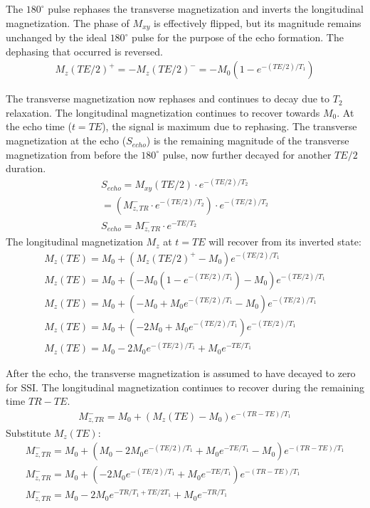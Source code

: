 \documentclass[10pt,a4paper,twoside]{article}
\begin{document}
\begin{enumerate}
\vspace{12pt}

The $180^\circ$ pulse rephases the transverse magnetization and inverts the longitudinal magnetization.
The phase of $M_{xy}$ is effectively flipped, but its magnitude remains unchanged by the ideal $180^\circ$ pulse for the purpose of the echo formation. The dephasing that occurred is reversed.
\begin{gather*}
M_z(TE/2)^+ = -M_z(TE/2)^- = -M_0(1 - e^{-(TE/2)/T_1})
\end{gather*}

\vspace{12pt}

The transverse magnetization now rephases and continues to decay due to $T_2$ relaxation. The longitudinal magnetization continues to recover towards $M_0$.
At the echo time ($t=TE$), the signal is maximum due to rephasing.
The transverse magnetization at the echo ($S_{echo}$) is the remaining magnitude of the transverse magnetization from before the $180^\circ$ pulse, now further decayed for another $TE/2$ duration.
\begin{gather*}
S_{echo} = M_{xy}(TE/2) \cdot e^{-(TE/2)/T_2} \\
= (M_{z,TR}^- \cdot e^{-(TE/2)/T_2}) \cdot e^{-(TE/2)/T_2} \\
S_{echo} = M_{z,TR}^- \cdot e^{-TE/T_2}
\end{gather*}
The longitudinal magnetization $M_z$ at $t=TE$ will recover from its inverted state:
\begin{gather*}
M_z(TE) = M_0 + (M_z(TE/2)^+ - M_0)e^{-(TE/2)/T_1} \\
M_z(TE) = M_0 + (-M_0(1 - e^{-(TE/2)/T_1}) - M_0)e^{-(TE/2)/T_1} \\
M_z(TE) = M_0 + (-M_0 + M_0 e^{-(TE/2)/T_1} - M_0)e^{-(TE/2)/T_1} \\
M_z(TE) = M_0 + (-2M_0 + M_0 e^{-(TE/2)/T_1})e^{-(TE/2)/T_1} \\
M_z(TE) = M_0 - 2M_0 e^{-(TE/2)/T_1} + M_0 e^{-TE/T_1}
\end{gather*}

\vspace{12pt}

After the echo, the transverse magnetization is assumed to have decayed to zero for SSI. The longitudinal magnetization continues to recover during the remaining time $TR-TE$.
\begin{gather*}
M_{z,TR}^- = M_0 + (M_z(TE) - M_0)e^{-(TR-TE)/T_1}
\end{gather*}
Substitute $M_z(TE)$:
\begin{gather*}
M_{z,TR}^- = M_0 + (M_0 - 2M_0 e^{-(TE/2)/T_1} + M_0 e^{-TE/T_1} - M_0)e^{-(TR-TE)/T_1} \\
M_{z,TR}^- = M_0 + (-2M_0 e^{-(TE/2)/T_1} + M_0 e^{-TE/T_1})e^{-(TR-TE)/T_1} \\
M_{z,TR}^- = M_0 - 2M_0 e^{-TR/T_1 + TE/2T_1} + M_0 e^{-TR/T_1}
\end{gather*}


\end{enumerate}
\end{document}
